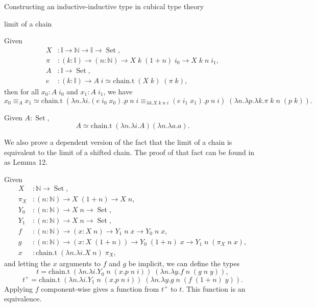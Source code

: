 \documentclass[acmsmall,review]{acmart}\settopmatter{printfolios=true,printccs=false,printacmref=false}
\DeclareMathOperator{\USet}{Set}
\newcommand{\IdA}[3]{{#1}\equiv_{#3}{#2}}
\newcommand{\N}{\mathbb{N}}
\newcommand{\I}{\mathbb{I}}
\begin{document}
\begin{section}{Constructing an inductive-inductive type in cubical type theory}
\begin{subsection}{limit of a chain}
\begin{lemma}
    Given \begin{align*}
    X &: \I \to \N \to \I \to \USet,\\
    \pi &: (k : \I) \to (n : \N) \to X\;k\;(1+n)\;i_0 \to X\;k\;n\;i_1,\\
    A &: \I \to \USet,\\
    e &: (k : \I) \to A\;i \simeq \text{chain.t}\;(X\;k)\;(\pi\;k),
    \end{align*}
    then for all $x_0 : A\;i_0$ and $x_1 : A\;i_1$, we have \[\IdA{x_0}{x_1}{A} \simeq \text{chain.t}\;(\lambda n.\lambda i. \IdA{(e\;i_0\;x_0).p\;n\;i}{(e\;i_1\;x_1).p\;n\;i}{\lambda k.X\;k\;n\;i})\;(\lambda n.\lambda p.\lambda k.\pi\;k\;n\;(p\;k)).\]
\end{lemma}

\begin{lemma}
    Given $A : \USet$, \[A \simeq \text{chain.t}\;(\lambda n.\lambda i.A)(\lambda n.\lambda a.a).\]
\end{lemma}

We also prove a dependent version of the fact that the limit of a chain is equivalent to the limit of a shifted chain. The proof of that fact can be found in \citet{nonwellfoundedtrees} as Lemma 12.

\begin{lemma}
    Given \begin{align*}
    X &: \N \to \USet,\\
    \pi_X &: (n : \N) \to X\;(1+n) \to X\;n,\\
    Y_0 &: (n : \N) \to X\;n \to \USet,\\
    Y_1 &: (n : \N) \to X\;n \to \USet,\\
    f &: (n : \N) \to (x : X\;n) \to Y_1\;n\;x \to Y_0\;n\;x,\\
    g &: (n : \N) \to (x : X\;(1+n)) \to Y_0\;(1+n)\;x \to Y_1\;n\;(\pi_X\;n\;x),\\
    x &: \text{chain.t}\;(\lambda n.\lambda i.X\;n)\;\pi_X,
    \end{align*}
    and letting the $x$ arguments to $f$ and $g$ be implicit,
    we can define the types \[t = \text{chain.t}\;(\lambda n.\lambda i.Y_0\;n\;(x.p\;n\;i))\;(\lambda n.\lambda y.f\;n\;(g\;n\;y)),\]\[t^+ = \text{chain.t}\;(\lambda n.\lambda i.Y_1\;n\;(x.p\;n\;i))\;(\lambda n.\lambda y.g\;n\;(f\;(1+n)\;y)).\]
    Applying $f$ component-wise gives a function from $t^+$ to $t$.
    This function is an equivalence.
\end{lemma}


\end{subsection}
\end{section}
\end{document}
